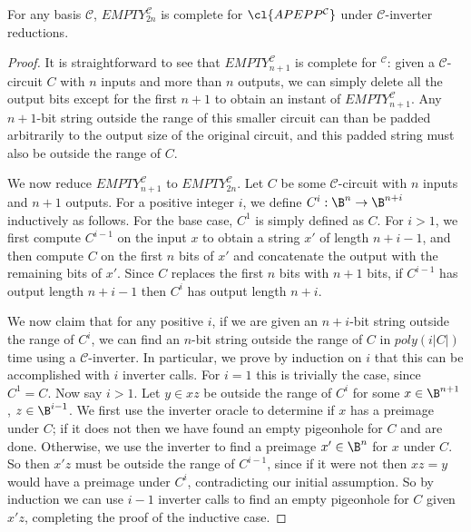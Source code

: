 \begin{lemma}\label{lem:swapping-sizes}
For any basis $\mathcal{C}$, {\sc $EMPTY_{2n}^{\mathcal{C}}$} is complete for $\cl{APEPP^{\mathcal{C}}}$ under $\mathcal{C}$-inverter reductions.
\end{lemma}
\begin{proof}
It is straightforward to see that {\sc $EMPTY_{n+1}^{\mathcal{C}}$} is complete for $^{\mathcal{C}}$: given a $\mathcal{C}$-circuit $C$ with $n$ inputs and more than $n$ outputs, we can simply delete all the output bits except for the first $n+1$ to obtain an instant of {\sc $EMPTY_{n+1}^{\mathcal{C}}$}. Any $n+1$-bit string outside the range of this smaller circuit can than be padded arbitrarily to the output size of the original circuit, and this padded string must also be outside the range of $C$.

We now reduce {\sc $EMPTY_{n+1}^{\mathcal{C}}$} to {\sc $EMPTY_{2n}^{\mathcal{C}}$}. Let $C$ be some $\mathcal{C}$-circuit with $n$ inputs and $n+1$ outputs. For a positive integer $i$, we define $C^i: \B^n \rightarrow \B^{n + i}$ inductively as follows. For the base case, $C^1$ is simply defined as $C$. For $i > 1$, we first compute $C^{i-1}$ on the input $x$ to obtain a string $x'$ of length $n + i - 1$, and then compute $C$ on the first $n$ bits of $x'$ and concatenate the output with the remaining bits of $x'$. Since $C$ replaces the first $n$ bits with $n+1$ bits, if $C^{i-1}$ has output length $n + i-1$ then $C^i$ has output length $n + i$.

We now claim that for any positive $i$, if we are given an $n+i$-bit string outside the range of $C^i$, we can find an $n$-bit string outside the range of $C$ in $poly(i|C|)$ time using a $\mathcal{C}$-inverter. In particular, we prove by induction on $i$ that this can be accomplished with $i$ inverter calls. For $i=1$ this is trivially the case, since $C^1=C$. Now say $i > 1$. Let $y \in xz$ be outside the range of $C^i$ for some $x \in \B^{n+1}$, $z \in \B^{i-1}$. We first use the inverter oracle to determine if $x$ has a preimage under $C$; if it does not then we have found an empty pigeonhole for $C$ and are done. Otherwise, we use the inverter to find a preimage $x' \in \B^n$ for $x$ under $C$. So then $x'z$ must be outside the range of $C^{i-1}$, since if it were not then $xz=y$ would have a preimage under $C^i$, contradicting our initial assumption. So by induction we can use $i-1$ inverter calls to find an empty pigeonhole for $C$ given $x'z$, completing the proof of the inductive case.


\end{proof}
